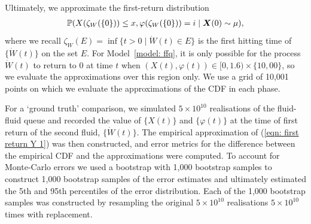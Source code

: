 Ultimately, we approximate the first-return distribution 
\begin{align}\label{eqn: first return Y 1}
	\mathbb P(X(\zeta_{W}(\{0\}))\leq x, \varphi(\zeta_{W}(\{0\}))=i\mid \boldsymbol X(0)\sim \mu),
\end{align}
where we recall \(\zeta_{W}(E) = \inf\{t>0\mid \dot W(t)\in E\}\) is the first hitting time of \(\{\dot W(t)\}\) on the set \(E\). For Model~\ref{model: ffq}, it is only possible for the process \(\dot W(t)\) to return to \(0\) at time \(t\) when \((X(t),\varphi(t))\in[0,1.6)\times \{10,00\}\), so we evaluate the approximations over this region only. We use a grid of 10,001 points on which we evaluate the approximations of the CDF in each phase. 

For a `ground truth' comparison, we simulated \(5\times 10^{10}\) realisations of the fluid-fluid queue and recorded the value of \(\{X(t)\}\) and \(\{\varphi(t)\}\) at the time of first return of the second fluid, \(\{\dot W(t)\}\). The empirical approximation of (\ref{eqn: first return Y 1}) was then constructed, and error metrics for the difference between the empirical CDF and the approximations were computed. To account for Monte-Carlo errors we used a bootstrap with 1,000 bootstrap samples to construct 1,000 bootstrap samples of the error estimates and ultimately estimated the 5th and 95th percentiles of the error distribution. Each of the 1,000 bootstrap samples was constructed by resampling the original \(5\times 10^{10}\) realisations \(5\times 10^{10}\) times with replacement.

